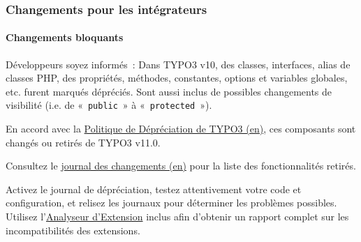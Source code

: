 %

\begin{frame}[fragile]
	\frametitle{Changements pour les intégrateurs}
	\framesubtitle{Changements bloquants}

	\small
		Développeurs soyez informés~: Dans TYPO3 v10, des classes, interfaces, alias de classes PHP,
		des propriétés, méthodes, constantes, options et variables globales, etc. furent marqués
		dépréciés. Sont aussi inclus de possibles changements de visibilité (i.e. de
		«~\texttt{public}~» à «~\texttt{protected}~»).

		\vspace{0.2cm}

		En accord avec la
		\href{https://typo3.org/article/typo3-deprecation-policy}{Politique de Dépréciation de TYPO3 (en)},
		ces composants sont changés ou retirés de TYPO3 v11.0.

		\vspace{0.2cm}

		Consultez le \href{https://docs.typo3.org/c/typo3/cms-core/master/en-us/Changelog/master/Breaking-91473-DeprecatedFunctionalityRemoved.html}{journal des changements (en)}
		pour la liste des fonctionnalités retirés.

		\vspace{0.2cm}

		Activez le journal de dépréciation, testez attentivement votre code et configuration, et
		relisez les journaux pour déterminer les problèmes possibles. Utilisez
		l'\href{https://docs.typo3.org/m/typo3/reference-coreapi/master/en-us/ApiOverview/ExtensionScanner/Index.html}{Analyseur d'Extension}
		inclus afin d'obtenir un rapport complet sur les incompatibilités des extensions.

	\normalsize

\end{frame}

